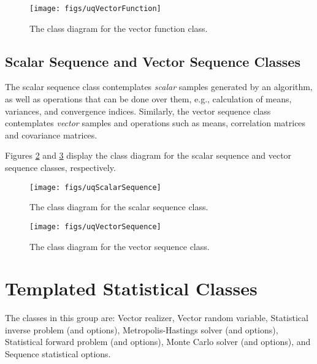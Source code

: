 \begin{figure}[htpb]
\centering
\texttt{[image: figs/uqVectorFunction]}
\vspace{-8pt}
\caption{The class diagram for the vector function class.}
\label{fig-vector-function-class}
\end{figure}


\subsection{Scalar Sequence and Vector Sequence Classes}\label{sec:scalar-vector-sequence}
%
The scalar sequence class contemplates {\it scalar} samples generated by an algorithm, as well as operations that can
be done over them, e.g., calculation of means, variances, and convergence indices.
Similarly, the vector sequence class contemplates {\it vector} samples and operations such as means, correlation matrices and covariance matrices.

Figures \ref{fig-scalar-sequence-class} and \ref{fig-vector-sequence-class} display the class diagram for the scalar sequence  and vector sequence classes, respectively.

\begin{figure}[htpb]
\centering
\texttt{[image: figs/uqScalarSequence]}
\vspace{-8pt}
\caption{The class diagram for the scalar sequence class.}
\label{fig-scalar-sequence-class}
\end{figure}

\begin{figure}[htpb]
\centering
\texttt{[image: figs/uqVectorSequence]}
\vspace{-8pt}
\caption{The class diagram for the vector sequence class.}
\label{fig-vector-sequence-class}
\end{figure}



\section{Templated Statistical Classes}

The classes in this group are: Vector realizer, Vector random variable, Statistical inverse problem (and options), Metropolis-Hastings solver (and options), Statistical forward problem (and options), Monte Carlo solver (and options), and Sequence statistical options.

